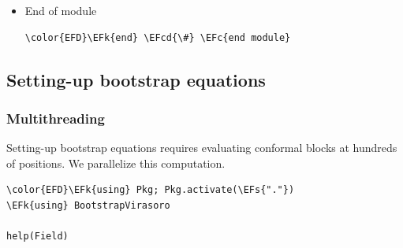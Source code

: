\documentclass[a4paper]{article}
\numberwithin{equation}{section}
\newcommand{\EFc}[1]{\textcolor{EFc}{#1}} %
\newcommand{\EFcd}[1]{\textcolor{EFcd}{#1}} %
\newcommand{\EFs}[1]{\textcolor{EFs}{#1}} %
\newcommand{\EFk}[1]{\textcolor{EFk}{#1}} %
\newcommand{\EFf}[1]{\textcolor{EFf}{#1}} %
\newcommand{\EFt}[1]{\textcolor{EFt}{#1}} %
\begin{document}
\begin{itemize}
\begin{Code}
\begin{Verbatim}
\EFs{"""}
    \EFs{block\_chiral\_schan(block::FourPointBlockSphere, corr::FourPointCorrelation, x, lr)}

\EFs{Compute the chiral conformal block}

\EFs{``\char92{}\char92{}mathcal F\char94{}\{\char92{}text\{torus\}\}\_\{\char92{}\char92{}delta\}(x)``}

\EFs{"""}
\EFk{function} \EFf{block\_chiral}(τ, Nmax, block\EFt{::OnePointBlockTorus}, corr\EFt{::OnePointCorrelation}, lr)
    δ = block.channelField[\EFs{"δ"}][lr]
    \EFk{return} q\EFt{\char94{}}δ\EFt{/}η(τ) \EFt{*} H(qfromtau(τ), Nmax, block, corr, lr)
\EFk{end}

\EFs{"""}
\EFs{Compute the non-chiral conformal block}

\EFs{`` \char92{}\char92{}mathcal F\_\{\char92{}\char92{}Delta\}\char94{}\{(\char92{}\char92{}text\{chan\})\}(\char92{}\char92{}Delta\_i| x)``}

\EFs{where ``\char92{}\char92{}text\{chan\}`` is `s`,`t` or `u`.}

\textcolor[HTML]{ff8e00}{\textbf{TODO:}} \EFs{logarithmic blocks}
\EFs{"""}
\EFk{function} \EFf{F\_one\_point\_torus}(τ, Nmax, block\EFt{::OnePointBlockTorus}, corr\EFt{::OnePointCorrelation})
    block\_chiral(τ, Nmax, block, corr, left) \EFt{*} conj(block\_chiral(conj(τ), Nmax, block, corr, right))
\EFk{end}
\end{Verbatim}
\end{Code}
\item End of module
\label{sec:orgbb1ca86}

\begin{Code}
\begin{Verbatim}
\color{EFD}\EFk{end} \EFcd{\#} \EFc{end module}
\end{Verbatim}
\end{Code}
\end{itemize}
\subsection{Setting-up bootstrap equations}
\label{sec:org9e4edec}
\subsubsection*{Multithreading}
\label{sec:orgba418fb}

Setting-up bootstrap equations requires evaluating conformal blocks at hundreds of positions. We parallelize this computation.

\begin{Code}
\begin{Verbatim}
\color{EFD}\EFk{using} Pkg; Pkg.activate(\EFs{"."})
\EFk{using} BootstrapVirasoro

help(Field)
\end{Verbatim}
\end{Code}
\end{document}
